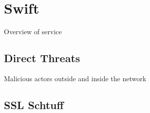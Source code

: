 \section{Swift}
Overview of service
\subsection{Direct Threats}
Malicious actors outside and inside the network
\subsection{SSL Schtuff}